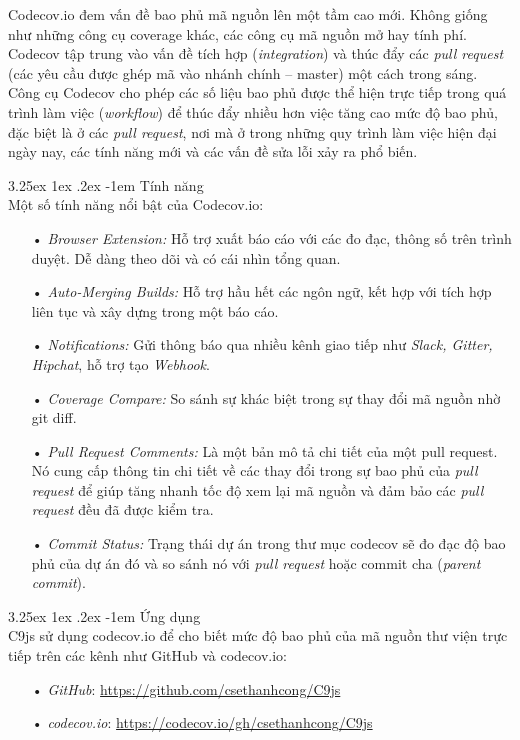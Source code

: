\documentclass[12pt,a4paper]{article}
\makeatletter
\newcommand{\myparagraph}[1]{\paragraph{#1}\mbox{}\\} %
\renewcommand\paragraph{\@startsection{paragraph}{5}{\z@}%
  {3.25ex \@plus1ex \@minus.2ex}%
  {-1em}%
  {\normalfont\normalsize\bfseries}}
\makeatother
\begin{document}
\begin{enumerate}
Codecov.io đem vấn đề bao phủ mã nguồn lên một tầm cao mới. Không giống như những công cụ coverage khác, các công cụ mã nguồn mở hay tính phí. Codecov tập trung vào vấn đề tích hợp (\textit{integration}) và thúc đẩy các \textit{pull request} (các yêu cầu được ghép mã vào nhánh chính – \textsf{master}) một cách trong sáng. Công cụ Codecov cho phép các số liệu bao phủ được thể hiện trực tiếp trong quá trình làm việc (\textit{workflow}) để thúc đẩy nhiều hơn việc tăng cao mức độ bao phủ, đặc biệt là ở các \textit{pull request}, nơi mà ở trong những quy trình làm việc hiện đại ngày nay, các tính năng mới và các vấn đề sửa lỗi xảy ra phổ biến.
\end{enumerate}

\myparagraph{Tính năng}
Một số tính năng nổi bật của Codecov.io: 
\begin{itemize}
\item[•] \emph{Browser Extension:} Hỗ trợ xuất báo cáo với các đo đạc, thông số trên trình duyệt. Dễ dàng theo dõi và có cái nhìn tổng quan.
\item[•] \emph{Auto-Merging Builds:} Hỗ trợ hầu hết các ngôn ngữ, kết hợp với tích hợp liên tục và xây dựng trong một báo cáo.
\item[•] \emph{Notifications:} Gửi thông báo qua nhiều kênh giao tiếp như \textit{Slack, Gitter, Hipchat}, hỗ trợ tạo \textit{Webhook}.
\item[•] \emph{Coverage Compare:} So sánh sự khác biệt trong sự thay đổi mã nguồn nhờ \textsf{git diff}.
\item[•] \emph{Pull Request Comments:} Là một bản mô tả chi tiết của một pull request. Nó cung cấp thông tin chi tiết về các thay đổi trong sự bao phủ của \textit{pull request} để giúp tăng nhanh tốc độ xem lại mã nguồn và đảm bảo các \textit{pull request} đều đã được kiểm tra.
\item[•] \emph{Commit Status:} Trạng thái dự án trong thư mục codecov sẽ đo đạc độ bao phủ của dự án đó và so sánh nó với \textit{pull request} hoặc commit cha (\textit{parent commit}).
\end{itemize}

\myparagraph{Ứng dụng}
C9js sử dụng codecov.io để cho biết mức độ bao phủ của mã nguồn thư viện trực tiếp trên các kênh như GitHub và codecov.io:

\begin{itemize}
\item[•] \emph{GitHub}: \url{https://github.com/csethanhcong/C9js}
\item[•] \emph{codecov.io}: \url{https://codecov.io/gh/csethanhcong/C9js}
\end{itemize}
\end{document}
